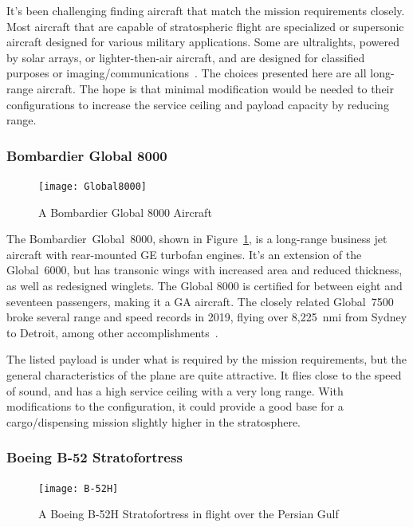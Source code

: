 \documentclass[12pt]{article}
\begin{document}
It's been challenging finding aircraft that match the mission requirements closely.
Most aircraft that are capable of stratospheric flight are specialized or supersonic aircraft designed for various military applications.
Some are ultralights, powered by solar arrays, or lighter-then-air aircraft, and are designed for classified purposes or imaging/communications~\cite{Piesing:2023aa}.
The choices presented here are all long-range aircraft.
The hope is that minimal modification would be needed to their configurations to increase the service ceiling and payload capacity by reducing range.


\subsubsection{Bombardier Global 8000}
\begin{figure}
	\centering
	\texttt{[image: Global8000]}
	\caption{A Bombardier Global 8000 Aircraft~\cite{pic:G8000}}
	\label{fig:G8000}
\end{figure}

The Bombardier~Global~8000, shown in Figure~\ref{fig:G8000}, is a long-range business jet aircraft with rear-mounted GE turbofan engines.
It's an extension of the Global~6000, but has transonic wings with increased area and reduced thickness, as well as redesigned winglets.
The Global 8000 is certified for between eight and seventeen passengers, making it a GA aircraft.
The closely related Global~7500 broke several range and speed records in 2019, flying over 8,225~nmi from Sydney to Detroit, among other accomplishments~\cite{Janes:2023ab}.

The listed payload is under what is required by the mission requirements, but the general characteristics of the plane are quite attractive.
It flies close to the speed of sound, and has a high service ceiling with a very long range.
With modifications to the configuration, it could provide a good base for a cargo/dispensing mission slightly higher in the stratosphere.


\subsubsection{Boeing B-52 Stratofortress}
\begin{figure}
	\centering
	\texttt{[image: B-52H]}
	\caption{A Boeing B-52H Stratofortress in flight over the Persian Gulf~\cite{pic:B52H}}
	\label{fig:B52H}
\end{figure}
\end{document}
